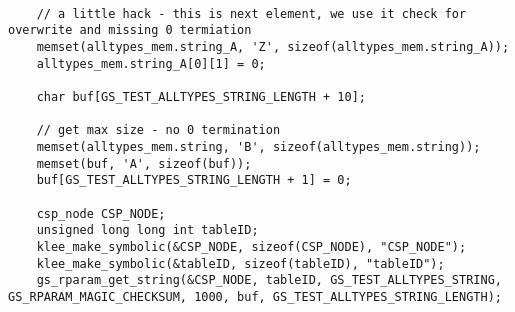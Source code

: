 \begin{lstlisting}[style=CStyle, caption=Test template to enable data-driven mutation testing for libParam, label=GSLtest]

    // a little hack - this is next element, we use it check for overwrite and missing 0 termiation
    memset(alltypes_mem.string_A, 'Z', sizeof(alltypes_mem.string_A));
    alltypes_mem.string_A[0][1] = 0;

    char buf[GS_TEST_ALLTYPES_STRING_LENGTH + 10];

    // get max size - no 0 termination
    memset(alltypes_mem.string, 'B', sizeof(alltypes_mem.string));
    memset(buf, 'A', sizeof(buf));
    buf[GS_TEST_ALLTYPES_STRING_LENGTH + 1] = 0;
    
    csp_node CSP_NODE;
    unsigned long long int tableID;
    klee_make_symbolic(&CSP_NODE, sizeof(CSP_NODE), "CSP_NODE");
    klee_make_symbolic(&tableID, sizeof(tableID), "tableID");
    gs_rparam_get_string(&CSP_NODE, tableID, GS_TEST_ALLTYPES_STRING, GS_RPARAM_MAGIC_CHECKSUM, 1000, buf, GS_TEST_ALLTYPES_STRING_LENGTH);

    
\end{lstlisting}



%
%
%
